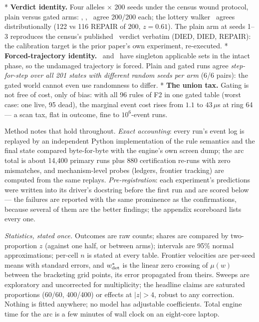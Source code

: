 \begitems
* {\bf Verdict identity.} Four alleles $\times$ 200 seeds under
the census wound protocol, plain versus gated arms: \la, \lb, \ld\
agree 200/200 each; the lottery walker \lc\ agrees
distributionally (122 vs 116 REPAIR of 200, $z=0.61$). The plain
arm at seeds 1--3 reproduces the census's published \lc\ verdict
verbatim (DIED, DIED, REPAIR): the calibration target is the prior
paper's own experiment, re-executed.
* {\bf Forced-trajectory identity.} \lb\ and \lc\ have singleton
applicable sets in the intact phase, so the undamaged trajectory
is forced. Plain and gated runs agree {\it step-for-step over all
201 states with different random seeds per arm} (6/6 pairs): the
gated world cannot even use randomness to differ.
* {\bf The union tax.} Gating is not free of cost, only of bias:
with all 96 rules of F2 in one gated table (worst case: one live,
95 dead), the marginal event cost rises from $1.1$ to
$43\,\mu$s at ring 64 --- a scan tax, flat in outcome, fine to
$10^6$-event runs.
\enditems

Method notes that hold throughout. {\it Exact accounting}: every
run's event log is replayed by an independent Python
implementation of the rule semantics and the final state compared
byte-for-byte with the engine's own screen dump; the arc total is
about 14{,}400 primary runs plus 880 certification re-runs with
zero mismatches, and mechanism-level
probes (ledgers, frontier tracking) are computed from the same
replays. {\it Pre-registration}: each experiment's predictions
were written into its driver's docstring before the first run and
are scored below --- the failures are reported with the same
prominence as the confirmations, because several of them are the
better findings; the appendix scoreboard lists every one.

{\it Statistics, stated once.} Outcomes are raw counts; shares are
compared by two-proportion $z$ (against one half, or between
arms); intervals are 95\% normal approximations; per-cell $n$ is
stated at every table. Frontier velocities are per-seed means with
standard errors, and $w^*_{\rm det}$ is the linear zero crossing
of $\mu(w)$ between the bracketing grid points, its error
propagated from theirs. Sweeps are exploratory and uncorrected for
multiplicity; the headline claims are saturated proportions
(60/60, 400/400) or effects at $|z|>4$, robust to any correction.
Nothing is fitted anywhere; no model has adjustable coefficients.
Total engine time for the arc is a few minutes of wall clock on an
eight-core laptop.

